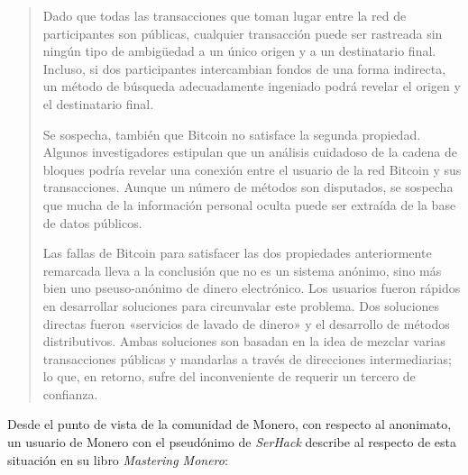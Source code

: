 \documentclass[12pt,a4paper,twoside]{book}
\begin{document}
\begin{quotation}
Dado que todas las transacciones que toman lugar entre la red de participantes son públicas, cualquier transacción puede ser rastreada sin ningún tipo de ambigüedad a un único origen y a un destinatario final. Incluso, si dos participantes intercambian fondos de una forma indirecta, un método de búsqueda adecuadamente ingeniado podrá revelar el origen y el destinatario final.

Se sospecha, también que Bitcoin no satisface la segunda propiedad. Algunos investigadores estipulan que un análisis cuidadoso de la cadena de bloques podría revelar una conexión entre el usuario de la red Bitcoin y sus transacciones. Aunque un número de métodos son disputados, se sospecha que mucha de la información personal oculta puede ser extraída de la base de datos públicos.

Las fallas de Bitcoin para satisfacer las dos propiedades anteriormente remarcada lleva a la conclusión que no es un sistema anónimo, sino más bien uno pseuso-anónimo de dinero electrónico. Los usuarios fueron rápidos en desarrollar soluciones para circunvalar este problema. Dos soluciones directas fueron «servicios de lavado de dinero» y el desarrollo de métodos distributivos. Ambas soluciones son basadan en la idea de mezclar varias transacciones públicas y mandarlas a través de direcciones intermediarias; lo que, en retorno, sufre del inconveniente de requerir un tercero de confianza. \cite[págs. 1-2]{monero:whitepaper}
\end{quotation}

Desde el punto de vista de la comunidad de Monero, con respecto al anonimato, un usuario de Monero con el pseudónimo de \textit{SerHack} describe al respecto de esta situación en su libro \textit{Mastering Monero}:
\end{document}
